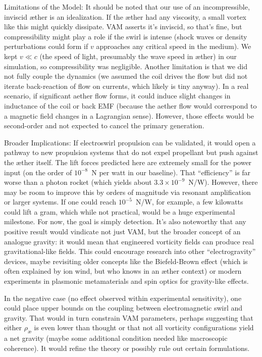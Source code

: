 \documentclass[twocolumn,aps,pre,floatfix,nofootinbib]{revtex4-2}
\begin{document}
Limitations of the Model: It should be noted that our use of an incompressible, inviscid æther is an idealization. If the æther had any viscosity, a small vortex like this might quickly dissipate. VAM asserts it’s inviscid, so that’s fine, but compressibility might play a role if the swirl is intense (shock waves or density perturbations could form if $v$ approaches any critical speed in the medium). We kept $v \ll c$ (the speed of light, presumably the wave speed in æther) in our simulation, so compressibility was negligible. Another limitation is that we did not fully couple the dynamics (we assumed the coil drives the flow but did not iterate back-reaction of flow on currents, which likely is tiny anyway). In a real scenario, if significant aether flow forms, it could induce slight changes in inductance of the coil or back EMF (because the aether flow would correspond to a magnetic field changes in a Lagrangian sense). However, those effects would be second-order and not expected to cancel the primary generation.


Broader Implications: If electroswirl propulsion can be validated, it would open a pathway to new propulsion systems that do not expel propellant but push against the æther itself. The lift forces predicted here are extremely small for the power input (on the order of $10^{-8}$~N per watt in our baseline). That “efficiency” is far worse than a photon rocket (which yields about $3.3\times10^{-9}$~N/W). However, there may be room to improve this by orders of magnitude via resonant amplification or larger systems. If one could reach $10^{-5}$~N/W, for example, a few kilowatts could lift a gram, which while not practical, would be a huge experimental milestone. For now, the goal is simply detection. It’s also noteworthy that any positive result would vindicate not just VAM, but the broader concept of an analogue gravity: it would mean that engineered vorticity fields can produce real gravitational-like fields. This could encourage research into other “electrogravity” devices, maybe revisiting older concepts like the Biefeld-Brown effect (which is often explained by ion wind, but who knows in an æther context) or modern experiments in plasmonic metamaterials and spin optics for gravity-like effects.


In the negative case (no effect observed within experimental sensitivity), one could place upper bounds on the coupling between electromagnetic swirl and gravity. That would in turn constrain VAM parameters, perhaps suggesting that either $\rho_{\text{æ}}$ is even lower than thought or that not all vorticity configurations yield a net gravity (maybe some additional condition needed like macroscopic coherence). It would refine the theory or possibly rule out certain formulations.
\end{document}
